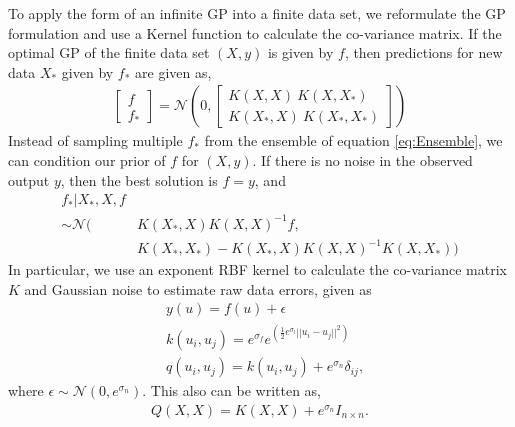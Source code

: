 \documentclass[conference]{IEEEtran}
\begin{document}
To apply the form of an infinite GP into a finite data set, we reformulate the GP formulation and use a Kernel function to calculate the co-variance matrix. 
If the optimal GP of the finite data set $(X,y)$ is given by $f$, then predictions for new data $X_*$ given by $f_*$ are given as,
\begin{equation}
\begin{aligned}
    \begin{bmatrix}
    f\\
    f_*
    \end{bmatrix} = \mathcal{N}\left( 0, \begin{bmatrix}
    K(X,X)\    K(X,X_*)\\
    K(X_*,X)\    K(X_*,X_*)
     \end{bmatrix}    
    \right)
    \label{eq:Ensemble}
\end{aligned}
\end{equation}
Instead of sampling multiple $f_*$ from the ensemble of equation \ref{eq:Ensemble}, we can condition our prior of $f$ for $(X,y)$. 
If there is no noise in the observed output $y$, then the best solution is $f=y$, and
\begin{equation}
\begin{aligned}
    f_*|X_*,X,f & \\
    \sim \mathcal{N} (& K(X_*,X)K(X,X)^{-1}f, \\
    & K(X_*,X_*)- K(X_*,X)K(X,X)^{-1}K(X,X_*)) 
    \label{eq:fstar}
\end{aligned}
\end{equation}
In particular, we use an exponent RBF kernel to calculate the co-variance matrix $K$ and Gaussian noise to estimate raw data errors, given as
\begin{equation}
\begin{aligned}
    &y(u) = f(u) + \epsilon\\
    &k(u_i,u_j) = e^{\sigma_f}e^{\left(\frac{1}{2}e^{\sigma_l}||u_i-u_j||^2\right)} \\
    &q(u_i,u_j) = k(u_i,u_j) + e^{\sigma_n}\delta_{ij},
    \label{eq:Kernel with noise}
\end{aligned}
\end{equation}
where $\epsilon \sim \mathcal{N}(0,e^{\sigma_n}).$
This also can be written as, 
\begin{equation}
\begin{aligned}
Q(X,X) = K(X,X) + e^{\sigma_n}I_{n\times n}.
\end{aligned}
\end{equation}
\end{document}
